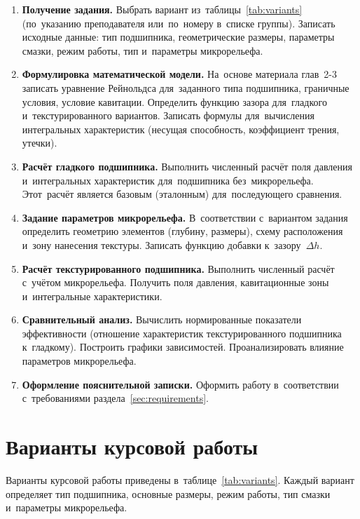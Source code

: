 \begin{enumerate}
\item \textbf{Получение задания.} Выбрать вариант из~таблицы~\ref{tab:variants} (по~указанию преподавателя или~по~номеру в~списке группы). Записать исходные данные: тип подшипника, геометрические размеры, параметры смазки, режим работы, тип и~параметры микрорельефа.

\item \textbf{Формулировка математической модели.} На~основе материала глав~2-3 записать уравнение Рейнольдса для~заданного типа подшипника, граничные условия, условие кавитации. Определить функцию зазора для~гладкого и~текстурированного вариантов. Записать формулы для~вычисления интегральных характеристик (несущая способность, коэффициент трения, утечки).

\item \textbf{Расчёт гладкого подшипника.} Выполнить численный расчёт поля давления и~интегральных характеристик для~подшипника без~микрорельефа. Этот~расчёт является базовым (эталонным) для~последующего сравнения.

\item \textbf{Задание параметров микрорельефа.} В~соответствии с~вариантом задания определить геометрию элементов (глубину, размеры), схему расположения и~зону нанесения текстуры. Записать функцию добавки к~зазору~$\Delta h$.

\item \textbf{Расчёт текстурированного подшипника.} Выполнить численный расчёт с~учётом микрорельефа. Получить поля давления, кавитационные зоны и~интегральные характеристики.

\item \textbf{Сравнительный анализ.} Вычислить нормированные показатели эффективности (отношение характеристик текстурированного подшипника к~гладкому). Построить графики зависимостей. Проанализировать влияние параметров микрорельефа.

\item \textbf{Оформление пояснительной записки.} Оформить работу в~соответствии с~требованиями раздела~\ref{sec:requirements}.
\end{enumerate}


\section{Варианты курсовой работы}\label{sec:variants}

Варианты курсовой работы приведены в~таблице~\ref{tab:variants}. Каждый вариант определяет тип подшипника, основные размеры, режим работы, тип смазки и~параметры микрорельефа.

